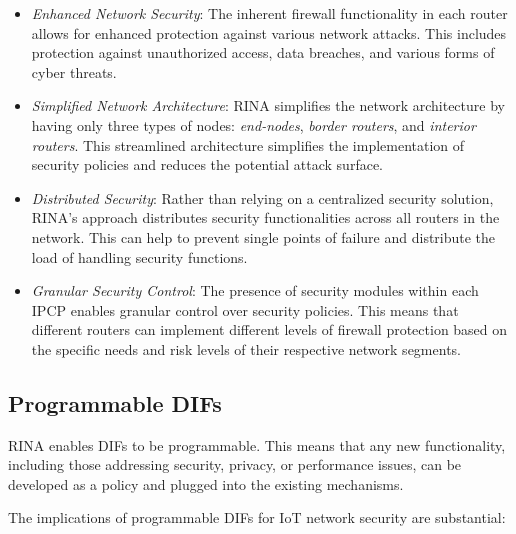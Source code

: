\documentclass{ieeeaccess}
\begin{document}
\begin{itemize}
	\item \textit{Enhanced Network Security}: The inherent firewall functionality in each router allows for enhanced protection against various network attacks. This includes protection against unauthorized access, data breaches, and various forms of cyber threats.
	\item \textit{Simplified Network Architecture}: RINA simplifies the network architecture by having only three types of nodes: \textit{end-nodes}, \textit{border routers}, and \textit{interior routers}. This streamlined architecture simplifies the implementation of security policies and reduces the potential attack surface.
	\item \textit{Distributed Security}: Rather than relying on a centralized security solution, RINA's approach distributes security functionalities across all routers in the network. This can help to prevent single points of failure and distribute the load of handling security functions.	
	\item \textit{Granular Security Control}: The presence of security modules within each IPCP enables granular control over security policies. This means that different routers can implement different levels of firewall protection based on the specific needs and risk levels of their respective network segments.
\end{itemize}

\subsection{Programmable DIFs}

RINA enables DIFs to be programmable. This means that any new functionality, including those addressing security, privacy, or performance issues, can be developed as a policy and plugged into the existing mechanisms.

The implications of programmable DIFs for IoT network security are substantial:
\end{document}
